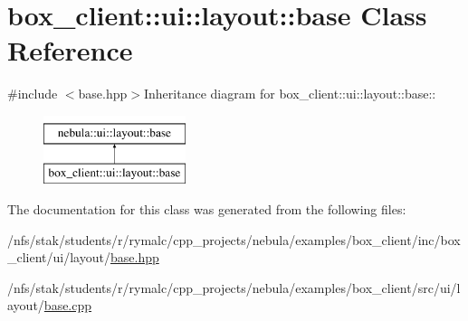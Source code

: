 \hypertarget{classbox__client_1_1ui_1_1layout_1_1base}{
\section{box\_\-client::ui::layout::base Class Reference}
\label{classbox__client_1_1ui_1_1layout_1_1base}
}


{\ttfamily \#include $<$base.hpp$>$}Inheritance diagram for box\_\-client::ui::layout::base::\begin{figure}[H]
\begin{center}
\leavevmode
\includegraphics[height=2cm]{classbox__client_1_1ui_1_1layout_1_1base}
\end{center}
\end{figure}


The documentation for this class was generated from the following files:\begin{DoxyCompactItemize}
\item 
/nfs/stak/students/r/rymalc/cpp\_\-projects/nebula/examples/box\_\-client/inc/box\_\-client/ui/layout/\hyperlink{examples_2box__client_2inc_2box__client_2ui_2layout_2base_8hpp}{base.hpp}\item 
/nfs/stak/students/r/rymalc/cpp\_\-projects/nebula/examples/box\_\-client/src/ui/layout/\hyperlink{examples_2box__client_2src_2ui_2layout_2base_8cpp}{base.cpp}\end{DoxyCompactItemize}
